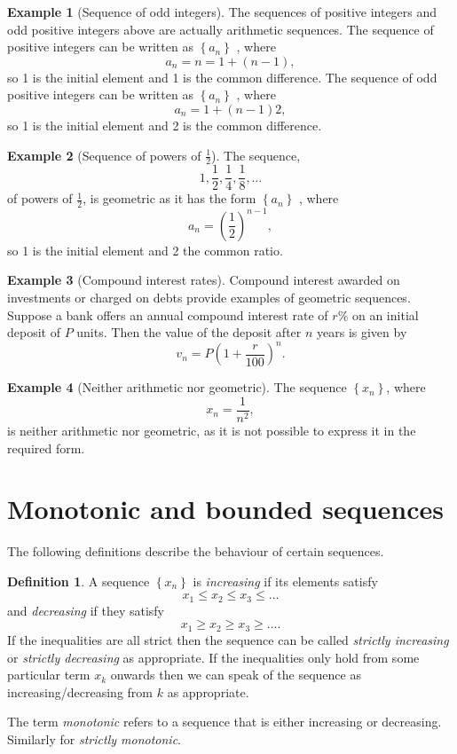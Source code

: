 \documentclass[extrafontsizes, twoside, a4paper]{memoir}
\theoremstyle{plain}%
\theoremstyle{definition}
\newtheorem{defn}{Definition}[chapter]
\newtheorem{exmp}{Example}[chapter]
\theoremstyle{remark}
\begin{document}
\begin{exmp}[Sequence of odd integers]
The sequences of positive integers and odd positive integers above are actually arithmetic
sequences. The sequence of positive integers can be written as $\left \{ a_n \right \}$ , where
$$a_n = n = 1 + (n - 1),$$
so 1 is the initial element and 1 is the common difference. The
sequence of odd positive integers can be written as $\left \{ a_n \right \}$ , where
$$a_n = 1 + (n - 1)2 ,$$
so 1 is the initial element and 2 is the common difference.
\end{exmp}
\begin{exmp}[Sequence of powers of $\frac{1}{2}$]
The sequence,
$$ 1, \frac{1}{2}, \frac{1}{4} , \frac{1}{8}, \dots $$
of powers of $\frac{1}{2}$, is geometric as it has the form $\left \{a_n \right \}$ , where
$$a_n = \left ( \frac{1}{2} \right )^{n-1},$$
so 1 is the initial element and 2 the common ratio.
\end{exmp}
\begin{exmp}[Compound interest rates]
Compound interest awarded on investments or charged on debts provide examples of geometric sequences. Suppose a bank offers an annual compound interest rate of $r \%$ on an initial deposit of $P$ units. Then the value of the deposit after $n$ years is given by
$$v_n = P \left ( 1 + \frac{r}{100} \right )^n .$$
\end{exmp}
\begin{exmp}[Neither arithmetic nor geometric]
\label{Ex:neither}
The sequence $\left \{ x_n \right \}$, where
$$x_n = \frac{1}{n^2} ,$$
is neither arithmetic nor geometric, as it is not possible to express it in the required form.
\end{exmp}
\section{Monotonic and bounded sequences}
The following definitions describe the behaviour of certain sequences.
\begin{defn}
A sequence $\left \{ x_n \right \}$ is \emph{increasing} if its elements satisfy
$$ x_1 \leq x_2 \leq x_3 \leq \dots $$
and \emph{decreasing} if they satisfy
$$ x_1 \geq x_2 \geq x_3 \geq \dots  .$$
If the inequalities are all strict then the sequence can be called \emph{strictly increasing} or \emph{strictly decreasing} as appropriate. If the inequalities only hold from some particular term $x_k$ onwards then we can speak of the sequence as increasing/decreasing from $k$ as appropriate.

The term \emph{monotonic} refers to a sequence that is either increasing or decreasing. Similarly for \emph{strictly monotonic}.
\end{defn}
\end{document}
